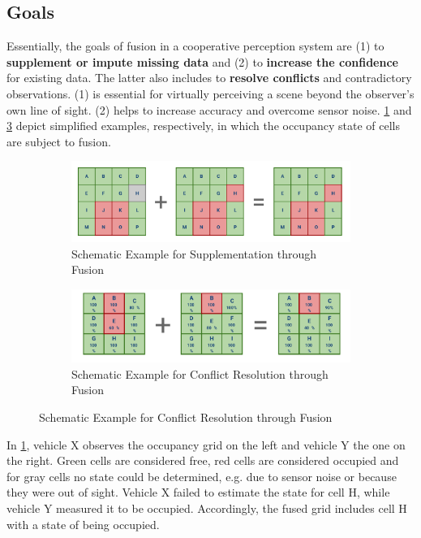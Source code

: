 \subsection{Goals}
\label{subsec:concept_design:fusion_goals}
Essentially, the goals of fusion in a cooperative perception system are (1) to \textbf{supplement or impute missing data} and (2) to \textbf{increase the confidence} for existing data. The latter also includes to \textbf{resolve conflicts} and contradictory observations. (1) is essential for virtually perceiving a scene beyond the observer's own line of sight. (2) helps to increase accuracy and overcome sensor noise. \cref{fig:fusion_goals_1} and \cref{fig:fusion_goals_2} depict simplified examples, respectively, in which the occupancy state of cells are subject to fusion.
\par
\bigskip

\begin{figure}[h]
	\centering
	\begin{subfigure}[b]{1\textwidth}
		\includegraphics[width=0.9\linewidth]{98_images/fusion_goals_ex1}
		\caption{Schematic Example for Supplementation through Fusion}
		\label{fig:fusion_goals_1}
	\end{subfigure}
	
	\begin{subfigure}[b]{1\textwidth}
		\includegraphics[width=0.89\linewidth]{98_images/fusion_goals_ex2}
		\caption{Schematic Example for Conflict Resolution through Fusion}
		\label{fig:fusion_goals_2}
	\end{subfigure}
\end{figure}

In \cref{fig:fusion_goals_1}, vehicle X observes the occupancy grid on the left and vehicle Y the one on the right. Green cells are considered free, red cells are considered occupied and for gray cells no state could be determined, e.g. due to sensor noise or because they were out of sight. Vehicle X failed to estimate the state for cell H, while vehicle Y measured it to be occupied. Accordingly, the fused grid includes cell H with a state of being occupied.

